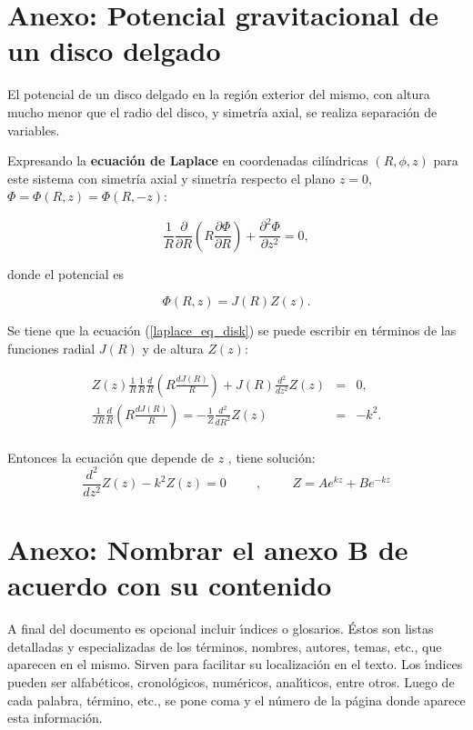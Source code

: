 \begin{appendix}
\chapter{Anexo: Potencial gravitacional de un disco delgado}\label{AnexoA}
El potencial de un disco delgado en la región exterior del mismo, con altura mucho menor que el radio del disco, y simetría axial, se realiza separación de variables.

Expresando la \textbf{ecuación de Laplace} en coordenadas cilíndricas $(R, \phi, z)$ para este sistema con simetría axial y simetría respecto el plano $z=0$, $\Phi = \Phi(R, z) = \Phi(R, -z)$:

\begin{equation}
\label{laplace_eq_disk}
\frac{1}{R} \frac{\partial }{\partial R}  \left ( R \frac{\partial \Phi }{\partial R}  \right ) + \frac{\partial^2 \Phi }{\partial z^2}  = 0,
\end{equation}

donde el potencial es

$$ \Phi(R,z) = J(R) Z(z). $$

Se tiene que la ecuación (\ref{laplace_eq_disk}) se puede escribir en términos de las funciones radial $J(R)$ y de altura $Z(z)$:

\begin{eqnarray}
   Z(z) \frac{1}{R} \frac{1}{R} \frac{d}{R} \left( R \frac{d J(R)}{R} \right) + J(R) \frac{d^2}{d z^2} Z(z) &=& 0, \\
    \frac{1}{JR} \frac{d}{R}  \left( R \frac{d J(R)}{R} \right) = -\frac{1}{Z}  \frac{d^2}{d R^2} Z(z) &=& -k^2.  \\
\end{eqnarray}

Entonces  la ecuación que depende de $z$ , tiene solución:
$$  \frac{d^2}{d z^2} Z(z)  -k^2 Z(z) = 0    \hspace{1cm}, \hspace{1cm} Z=A e^{kz} + B e^{-kz} $$







\chapter{Anexo: Nombrar el anexo B de acuerdo con su contenido}
A final del documento es opcional incluir \'{\i}ndices o glosarios. \'{E}stos son listas detalladas y especializadas de los t\'{e}rminos, nombres, autores, temas, etc., que aparecen en el mismo. Sirven para facilitar su localizaci\'{o}n en el texto. Los \'{\i}ndices pueden ser alfab\'{e}ticos, cronol\'{o}gicos, num\'{e}ricos, anal\'{\i}ticos, entre otros. Luego de cada palabra, t\'{e}rmino, etc., se pone coma y el n\'{u}mero de la p\'{a}gina donde aparece esta informaci\'{o}n.\\


\end{appendix}
